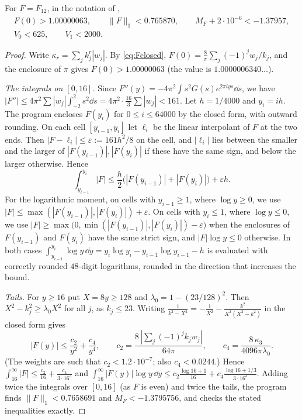 \documentclass[11pt,colorlinks]{charlie}
\begin{document}
\begin{lemma}\label{lem:twelve}
For $F=F_{12}$, in the notation of ,
\begin{gather*}
 F(0)>1.00000063,\qquad\|F\|_1<0.765870,\qquad M_F+2\cdot10^{-6}<-1.37957,\\
 V_0<625,\qquad V_1<2000.
\end{gather*}
\end{lemma}
\begin{proof}
Write $\kappa_r=\sum_jk_j^r|w_j|$. By \eqref{eq:Fclosed}, $F(0)=\frac8\pi\sum_j(-1)^jw_j/k_j$, and the enclosure of $\pi$ gives $F(0)>1.00000063$ (the value is $1.0000006340\ldots$).

\emph{The integrals on $[0,16]$.} Since $F''(y)=-4\pi^2\int s^2G(s)e^{2\pi iys}\dd s$, we have $|F''|\le4\pi^2\sum|w_j|\int_{-2}^2s^2\dd s=4\pi^2\cdot\frac{16}3\sum|w_j|<161$. Let $h=1/4000$ and $y_i=ih$. The program encloses $F(y_i)$ for $0\le i\le64000$ by the closed form, with outward rounding. On each cell $[y_{i-1},y_i]$ let $\ell_i$ be the linear interpolant of $F$ at the two ends. Then $|F-\ell_i|\le\varepsilon:=161h^2/8$ on the cell, and $|\ell_i|$ lies between the smaller and the larger of $|F(y_{i-1})|,|F(y_i)|$ if these have the same sign, and below the larger otherwise. Hence
\[
 \int_{y_{i-1}}^{y_i}|F|\le\frac h2\big(|F(y_{i-1})|+|F(y_i)|\big)+\varepsilon h .
\]
For the logarithmic moment, on cells with $y_{i-1}\ge1$, where $\log y\ge0$, we use $|F|\le\max(|F(y_{i-1})|,|F(y_i)|)+\varepsilon$. On cells with $y_i\le1$, where $\log y\le0$, we use $|F|\ge\max\big(0,\min(|F(y_{i-1})|,|F(y_i)|)-\varepsilon\big)$ when the enclosures of $F(y_{i-1})$ and $F(y_i)$ have the same strict sign, and $|F|\log y\le0$ otherwise. In both cases $\int_{y_{i-1}}^{y_i}\log y\,\dd y=y_i\log y_i-y_{i-1}\log y_{i-1}-h$ is evaluated with correctly rounded $48$-digit logarithms, rounded in the direction that increases the bound.

\emph{Tails.} For $y\ge16$ put $X=8y\ge128$ and $\lambda_0=1-(23/128)^2$. Then $X^2-k_j^2\ge\lambda_0X^2$ for all $j$, as $k_j\le23$. Writing $\frac1{k^2-X^2}=-\frac1{X^2}-\frac{k^2}{X^2(X^2-k^2)}$ in the closed form gives
\[
 |F(y)|\le\frac{c_2}{y^2}+\frac{c_4}{y^4},\qquad c_2=\frac{8\,|\sum_j(-1)^jk_jw_j|}{64\pi},\qquad c_4=\frac{8\,\kappa_3}{4096\pi\lambda_0}.
\]
(The weights are such that $c_2<1.2\cdot10^{-7}$; also $c_4<0.0244$.) Hence $\int_{16}^\infty|F|\le\frac{c_2}{16}+\frac{c_4}{3\cdot16^3}$ and $\int_{16}^\infty|F(y)|\log y\,\dd y\le c_2\frac{\log16+1}{16}+c_4\frac{\log16+1/3}{3\cdot16^3}$. Adding twice the integrals over $[0,16]$ (as $F$ is even) and twice the tails, the program finds $\|F\|_1<0.7658691$ and $M_F<-1.3795756$, and checks the stated inequalities exactly.


\end{proof}
\end{document}
